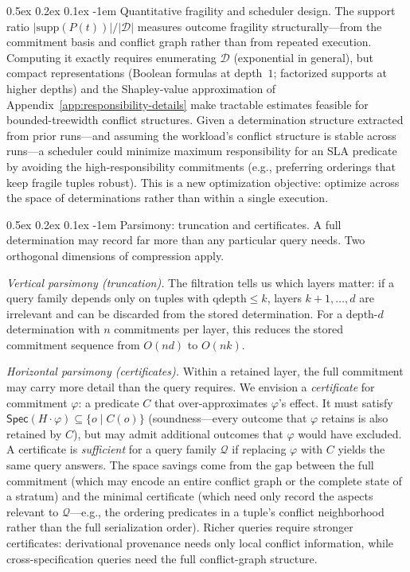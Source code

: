 \documentclass[acmsmall,review,anonymous]{acmart}
\makeatletter
\renewcommand{\paragraph}{\@startsection{paragraph}{4}{\z@}%
  {0.5ex \@plus 0.2ex \@minus 0.1ex}%
  {-1em}%
  {\normalfont\normalsize\bfseries}}
\newcommand{\Spec}{\mathsf{Spec}}
\theoremstyle{remark}
\numberwithin{definition}{section}
\numberwithin{theorem}{section}
\numberwithin{lemma}{section}
\numberwithin{corollary}{section}
\numberwithin{remark}{section}
\numberwithin{example}{section}
\numberwithin{observation}{section}
\numberwithin{assumption}{section}
\makeatother
\begin{document}
\paragraph{Quantitative fragility and scheduler design.}
The support ratio $|\mathrm{supp}(P(t))| / |\mathcal{D}|$ measures
outcome fragility structurally---from the commitment basis and conflict
graph rather than from repeated execution.
Computing it exactly requires enumerating $\mathcal{D}$ (exponential in
general), but compact representations (Boolean formulas at depth~$1$;
factorized supports at higher depths) and the Shapley-value
approximation of Appendix~\ref{app:responsibility-details} make
tractable estimates feasible for bounded-treewidth conflict structures.
Given a determination structure extracted from prior runs---and
assuming the workload's conflict structure is stable across
runs---a scheduler could minimize maximum responsibility for an
SLA predicate by avoiding the high-responsibility commitments
(e.g., preferring orderings that keep fragile tuples robust).
This is a new optimization objective: optimize across the space of
determinations rather than within a single execution.

\paragraph{Parsimony: truncation and certificates.}
A full determination may record far more than any particular query
needs.
Two orthogonal dimensions of compression apply.

\emph{Vertical parsimony (truncation).}
The filtration tells us which layers matter: if a query family depends
only on tuples with $\mathrm{qdepth} \le k$, layers
$k{+}1, \ldots, d$ are irrelevant and can be discarded from the
stored determination.
For a depth-$d$ determination with $n$ commitments per layer, this
reduces the stored commitment sequence from $O(nd)$ to $O(nk)$.

\emph{Horizontal parsimony (certificates).}
Within a retained layer, the full commitment may carry more detail than
the query requires.
We envision a \emph{certificate} for commitment $\varphi$: a predicate $C$ that
over-approximates $\varphi$'s effect.
It must satisfy
$\Spec(H \cdot \varphi) \subseteq \{o \mid C(o)\}$
(soundness---every outcome that $\varphi$ retains is also retained by
$C$), but may admit additional outcomes that $\varphi$ would have
excluded.
A certificate is \emph{sufficient} for a query family $\mathcal{Q}$ if
replacing $\varphi$ with $C$ yields the same query answers.
The space savings come from the gap between the full commitment (which
may encode an entire conflict graph or the complete state of a
stratum) and the minimal certificate (which need only record the
aspects relevant to $\mathcal{Q}$---e.g., the ordering predicates in a
tuple's conflict neighborhood rather than the full serialization order).
Richer queries require stronger certificates:
derivational provenance needs only local conflict information, while
cross-specification queries need the full conflict-graph structure.
\end{document}
